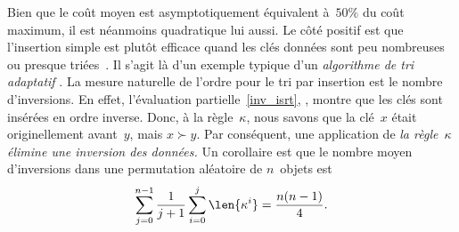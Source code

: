 Bien que le coût moyen est asymptotiquement équivalent à~\(50\%\) du
coût maximum, il est néanmoins quadratique lui aussi. Le côté positif
est que l'insertion simple est plutôt efficace quand les clés données
sont peu nombreuses ou presque triées~\citep{CookKim_1980}. Il s'agit
là d'un exemple typique d'un \emph{algorithme de tri adaptatif}
\citep{EstivillWood_1992,MoffatPetersson_1992}. La mesure naturelle de l'ordre pour le tri
par insertion est le nombre d'inversions. En effet, l'évaluation
partielle~\eqref{inv_isrt}, , montre que les clés
sont insérées en ordre inverse. Donc, à la règle~\(\kappa\), nous
savons que la clé~\(x\) était originellement avant~\(y\), mais \(x
\succ y\). Par conséquent, une application de \emph{la
  règle~\(\kappa\) élimine une inversion des données.} Un corollaire
est que le nombre moyen d'inversions dans une permutation aléatoire de
\(n\)~objets est
\begin{equation*}
\belowdisplayskip=-5pt
\sum_{j=0}^{n-1}\frac{1}{j+1}\sum_{i=0}^{j}\len{\kappa^i} =
\frac{n(n-1)}{4}.
\end{equation*}

